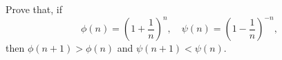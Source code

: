  Prove that, if
\[
\phi(n) = \left(1 + \frac{1}{n}\right)^{n},\quad
\psi(n) = \left(1 - \frac{1}{n}\right)^{-n},
\]
then $\phi(n + 1) > \phi(n)$ and $\psi(n + 1) < \psi(n)$.

